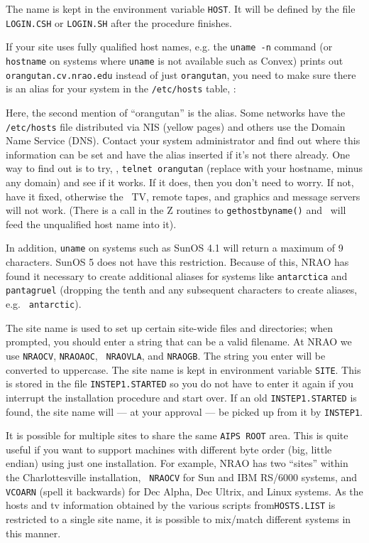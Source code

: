 The name is kept in the environment variable {\tt HOST}.  It will be
defined by the file {\tt LOGIN.CSH} or {\tt LOGIN.SH} after the
procedure finishes.

If your site uses fully qualified host names, e.g. the {\tt uname -n}
command (or {\tt hostname} on systems where {\tt uname} is not available
such as Convex) prints out {\tt orangutan.cv.nrao.edu} instead of just
{\tt orangutan}, you need to make sure there is an alias for your system
in the {\tt /etc/hosts} table, \eg:\medskip

\medskip

\noindent Here, the second mention of ``orangutan'' is the alias.  Some
networks have the {\tt /etc/hosts} file distributed via NIS (yellow
pages) and others use the Domain Name Service (DNS).  Contact your
system administrator and find out where this information can be set and
have the alias inserted if it's not there already.  One way to find out
is to try, \eg, {\tt telnet orangutan} (replace with your hostname,
minus any domain) and see if it works.  If it does, then you don't need
to worry.  If not, have it fixed, otherwise the \AIPS\ TV, remote tapes,
and graphics and message servers will not work.  (There is a call in the
Z routines to {\tt gethostbyname()} and \ttaips\ will feed the
unqualified host name into it).

In addition, {\tt uname} on systems such as SunOS 4.1 will return a
maximum of 9 characters.  SunOS 5 does not have this restriction.
Because of this, NRAO has found it necessary to create additional
aliases for systems like {\tt antarctica} and {\tt pantagruel} (dropping
the tenth and any subsequent characters to create aliases, e.g. {\tt
antarctic}).

\medskip{}

The site name is used to set up certain site-wide files and
directories; when prompted, you should enter a string that can be a
valid filename.  At NRAO we use {\tt NRAOCV}, {\tt NRAOAOC}, {\tt
NRAOVLA}, and {\tt NRAOGB}.  The string you enter will be converted to
uppercase.  The site name is kept in environment variable {\tt SITE}.
This is stored in the file {\tt INSTEP1.STARTED} so you do not have to
enter it again if you interrupt the installation procedure and start
over.  If an old {\tt INSTEP1.STARTED} is found, the site name will ---
at your approval --- be picked up from it by {\tt INSTEP1}.

It is possible for multiple sites to share the same {\tt AIPS ROOT}
area.  This is quite useful if you want to support machines with different
byte order (big, little endian) using just one installation.  For example,
NRAO has two ``sites'' within the Charlottesville installation, {\tt
NRAOCV} for Sun and IBM RS/6000 systems, and {\tt VCOARN} (spell it
backwards) for Dec Alpha, Dec Ultrix, and Linux systems.  As the hosts and
tv information obtained by the various scripts from{\tt HOSTS.LIST} is
restricted to a single site name, it is possible to mix/match different
systems in this manner.

